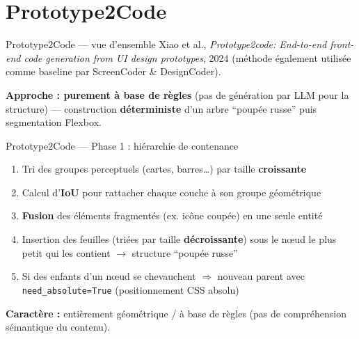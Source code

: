 \documentclass[10pt,aspectratio=169]{beamer}
\begin{document}
\section{Prototype2Code}
\begin{frame}{Prototype2Code --- vue d'ensemble}
\footnotesize Xiao et al., \emph{Prototype2code: End-to-end front-end code generation from UI design prototypes}, 2024 (méthode également utilisée comme baseline par ScreenCoder \& DesignCoder).

\vspace{2mm}
\textbf{Approche : purement à base de règles} (pas de génération par LLM pour la structure) — construction \textbf{déterministe} d'un arbre ``poupée russe'' puis segmentation Flexbox.

\begin{center}
\end{center}
\end{frame}

\begin{frame}{Prototype2Code --- Phase 1 : hiérarchie de contenance}
\begin{enumerate}
  \item Tri des groupes perceptuels (cartes, barres\ldots) par taille \textbf{croissante}
  \item Calcul d'\textbf{IoU} pour rattacher chaque couche à son groupe géométrique
  \item \textbf{Fusion} des éléments fragmentés (ex. icône coupée) en une seule entité
  \item Insertion des feuilles (triées par taille \textbf{décroissante}) sous le n\oe ud le plus petit qui les contient $\to$ structure ``poupée russe''
  \item Si des enfants d'un n\oe ud se chevauchent $\Rightarrow$ nouveau parent avec \texttt{need\_absolute=True} (positionnement CSS absolu)
\end{enumerate}
\textbf{Caractère :} entièrement géométrique / à base de règles (pas de compréhension sémantique du contenu).
\end{frame}
\end{document}
